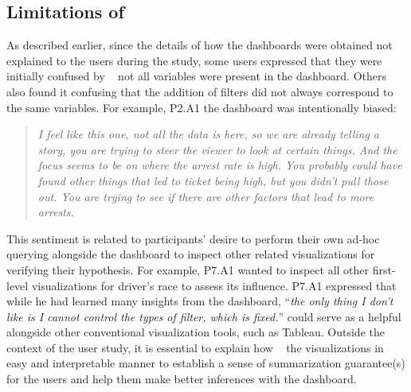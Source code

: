 \subsection{Limitations of \system}
\par As described earlier, since the details of how the dashboards were obtained  not explained to the users during the study, some users expressed that they were initially confused by \system\  not all variables were present in the dashboard. Others also found it confusing that the addition of filters did not always correspond to the same variables. For example, P2.A1  the dashboard was intentionally biased:
\begin{quote}
\textit{I feel like this one, not all the data is here, so we are already telling a story, you are trying to steer the viewer to look at certain things. And the focus seems to be on where the arrest rate is high. You probably could have found other things that led to ticket being high, but you didn't pull those out. You are trying to see if there are other factors that lead to more arrests.}
\end{quote}
\npar This sentiment is related to participants' desire to perform their own ad-hoc querying alongside the dashboard to inspect other related visualizations for verifying their hypothesis. For example, P7.A1 wanted to inspect all other first-level visualizations for driver's race to assess its influence. P7.A1 expressed that while he had learned many insights from the dashboard, ``\textit{the only thing I don't like is I cannot control the types of filter, which is fixed.}''
 \system could serve as a helpful  alongside other conventional visualization tools, such as Tableau. Outside the context of the user study, it is essential to explain how \system\  the visualizations in  easy and interpretable manner to establish a sense of 
summarization guarantee(s) for the users and
help them make better inferences with the dashboard.

